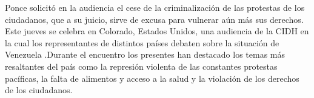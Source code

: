 \documentclass{article}%
\begin{document}
\newline%
%
Ponce solicitó en la audiencia el cese de la criminalización de las protestas de los ciudadanos, que a su juicio, sirve de excusa para vulnerar aún más sus derechos.%
\newline%
%
Este jueves se celebra en Colorado, Estados Unidos, una audiencia de la CIDH en la cual los representantes de distintos países debaten sobre la situación de Venezuela .Durante el encuentro los presentes han destacado los temas más resaltantes del país como la represión violenta de las constantes protestas pacíficas, la falta de alimentos y acceso a la salud y la violación de los derechos de los ciudadanos.%
\newline%
%
\end{document}
